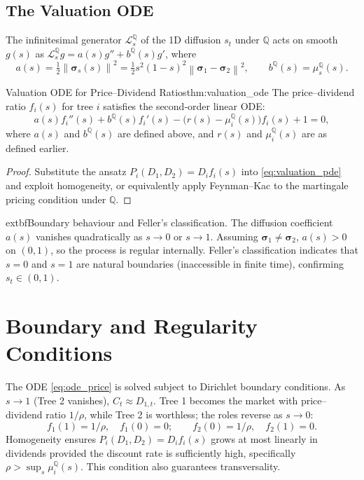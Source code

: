 ﻿\documentclass[11pt,letterpaper,oneside]{article}
\numberwithin{equation}{section}
\newcommand{\1}{\mathbf{1}}
\newcommand{\norm}[1]{\left\lVert #1\right\rVert}
\begin{document}
\subsection{The Valuation ODE}

The infinitesimal generator $\mathcal{L}^{\mathbb{Q}}_s$ of the 1D diffusion $s_t$ under $\mathbb{Q}$ acts on smooth $g(s)$ as $\mathcal{L}^{\mathbb{Q}}_s g = a(s) g'' + b^{\mathbb{Q}}(s) g'$, where
\[
  a(s) = \tfrac12 \norm{\bm{\sigma}_s(s)}^2 = \tfrac12 s^2(1-s)^2\norm{\bm{\sigma}_1-\bm{\sigma}_2}^2,\qquad
  b^{\mathbb{Q}}(s)=\mu_s^{\mathbb{Q}}(s).
\]

\begin{theorem}{Valuation ODE for Price--Dividend Ratios}{thm:valuation_ode}
The price--dividend ratio $f_i(s)$ for tree $i$ satisfies the second-order linear ODE:
\begin{equation}\label{eq:ode_price}
  a(s) f_i''(s) + b^{\mathbb{Q}}(s) f_i'(s) - \big(r(s)-\mu_i^{\mathbb{Q}}(s)\big) f_i(s) + 1 = 0,
\end{equation}
where $a(s)$ and $b^{\mathbb{Q}}(s)$ are defined above, and $r(s)$ and $\mu_i^{\mathbb{Q}}(s)$ are as defined earlier.
\end{theorem}
\begin{proof}
Substitute the ansatz $P_i(D_1,D_2)=D_i f_i(s)$ into \eqref{eq:valuation_pde} and exploit homogeneity, or equivalently apply Feynman--Kac to the martingale pricing condition under $\mathbb{Q}$.
\end{proof}

\begin{tcolorbox}[mathstyle]
	extbf{Boundary behaviour and Feller's classification.} The diffusion coefficient $a(s)$ vanishes quadratically as $s\to0$ or $s\to1$. Assuming $\bm{\sigma}_1\neq\bm{\sigma}_2$, $a(s)>0$ on $(0,1)$, so the process is regular internally. Feller's classification indicates that $s=0$ and $s=1$ are natural boundaries (inaccessible in finite time), confirming $s_t\in(0,1)$.
\end{tcolorbox}

\section{Boundary and Regularity Conditions}
The ODE \eqref{eq:ode_price} is solved subject to Dirichlet boundary conditions. As $s\to 1$ (Tree 2 vanishes), $C_t\approx D_{1,t}$. Tree 1 becomes the market with price--dividend ratio $1/\rho$, while Tree 2 is worthless; the roles reverse as $s\to0$:
\[
  f_1(1)=1/\rho, \quad f_1(0)=0; \qquad f_2(0)=1/\rho, \quad f_2(1)=0.
\]
Homogeneity ensures $P_i(D_1,D_2)=D_i f_i(s)$ grows at most linearly in dividends provided the discount rate is sufficiently high, specifically $\rho>\sup_s \mu_i^{\mathbb{Q}}(s)$. This condition also guarantees transversality.
\end{document}
